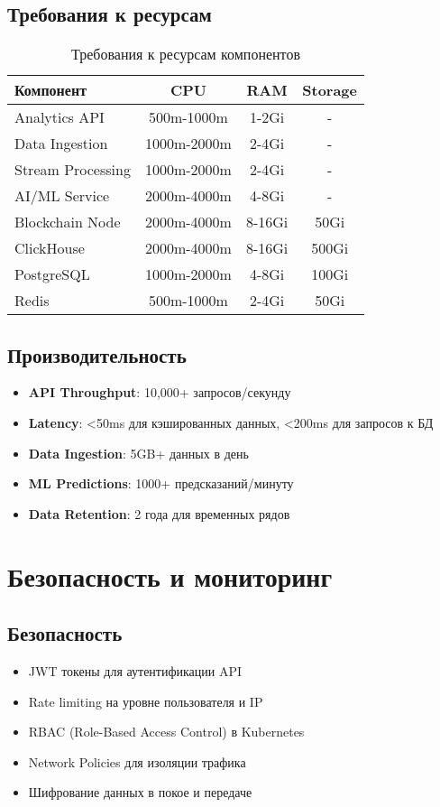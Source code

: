 \documentclass[11pt,a4paper]{article}
\begin{document}
\subsection{Требования к ресурсам}
\begin{table}[H]
\centering
\small
\begin{tabular}{|l|c|c|c|}
\hline
\textbf{Компонент} & \textbf{CPU} & \textbf{RAM} & \textbf{Storage} \\
\hline
Analytics API & 500m-1000m & 1-2Gi & - \\
Data Ingestion & 1000m-2000m & 2-4Gi & - \\
Stream Processing & 1000m-2000m & 2-4Gi & - \\
AI/ML Service & 2000m-4000m & 4-8Gi & - \\
Blockchain Node & 2000m-4000m & 8-16Gi & 50Gi \\
ClickHouse & 2000m-4000m & 8-16Gi & 500Gi \\
PostgreSQL & 1000m-2000m & 4-8Gi & 100Gi \\
Redis & 500m-1000m & 2-4Gi & 50Gi \\
\hline
\end{tabular}
\caption{Требования к ресурсам компонентов}
\end{table}

\subsection{Производительность}
\begin{itemize}
    \item \textbf{API Throughput}: 10,000+ запросов/секунду
    \item \textbf{Latency}: <50ms для кэшированных данных, <200ms для запросов к БД
    \item \textbf{Data Ingestion}: 5GB+ данных в день
    \item \textbf{ML Predictions}: 1000+ предсказаний/минуту
    \item \textbf{Data Retention}: 2 года для временных рядов
\end{itemize}

\section{Безопасность и мониторинг}

\subsection{Безопасность}
\begin{itemize}
    \item JWT токены для аутентификации API
    \item Rate limiting на уровне пользователя и IP
    \item RBAC (Role-Based Access Control) в Kubernetes
    \item Network Policies для изоляции трафика
    \item Шифрование данных в покое и передаче
\end{itemize}
\end{document}
